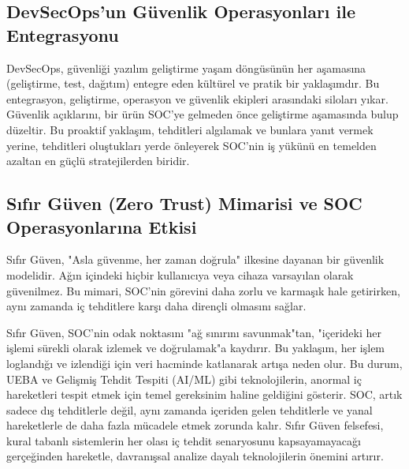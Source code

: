 \subsection{DevSecOps'un Güvenlik Operasyonları ile Entegrasyonu}

DevSecOps, güvenliği yazılım geliştirme yaşam döngüsünün her aşamasına (geliştirme, test, dağıtım) entegre eden kültürel ve pratik bir yaklaşımdır. Bu entegrasyon, geliştirme, operasyon ve güvenlik ekipleri arasındaki siloları yıkar. Güvenlik açıklarını, bir ürün SOC'ye gelmeden önce geliştirme aşamasında bulup düzeltir. Bu proaktif yaklaşım, tehditleri algılamak ve bunlara yanıt vermek yerine, tehditleri oluştukları yerde önleyerek SOC'nin iş yükünü en temelden azaltan en güçlü stratejilerden biridir.

\subsection{Sıfır Güven (Zero Trust) Mimarisi ve SOC Operasyonlarına Etkisi}

Sıfır Güven, "Asla güvenme, her zaman doğrula" ilkesine dayanan bir güvenlik modelidir. Ağın içindeki hiçbir kullanıcıya veya cihaza varsayılan olarak güvenilmez. Bu mimari, SOC'nin görevini daha zorlu ve karmaşık hale getirirken, aynı zamanda iç tehditlere karşı daha dirençli olmasını sağlar.

Sıfır Güven, SOC'nin odak noktasını "ağ sınırını savunmak"tan, "içerideki her işlemi sürekli olarak izlemek ve doğrulamak"a kaydırır. Bu yaklaşım, her işlem loglandığı ve izlendiği için veri hacminde katlanarak artışa neden olur. Bu durum, UEBA ve Gelişmiş Tehdit Tespiti (AI/ML) gibi teknolojilerin, anormal iç hareketleri tespit etmek için temel gereksinim haline geldiğini gösterir. SOC, artık sadece dış tehditlerle değil, aynı zamanda içeriden gelen tehditlerle ve yanal hareketlerle de daha fazla mücadele etmek zorunda kalır. Sıfır Güven felsefesi, kural tabanlı sistemlerin her olası iç tehdit senaryosunu kapsayamayacağı gerçeğinden hareketle, davranışsal analize dayalı teknolojilerin önemini artırır.